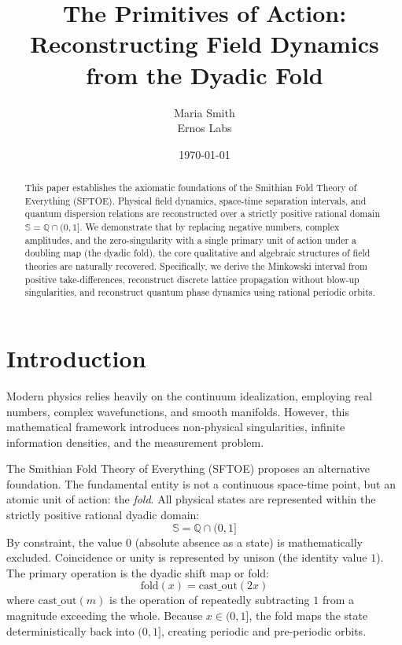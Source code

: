 \documentclass[11pt,a4paper]{article}
\title{\textbf{The Primitives of Action: Reconstructing Field Dynamics from the Dyadic Fold}}
\author{Maria Smith \\ Ernos Labs}
\date{\today}
\begin{document}
\maketitle

\begin{abstract}
This paper establishes the axiomatic foundations of the Smithian Fold Theory of Everything (SFTOE). Physical field dynamics, space-time separation intervals, and quantum dispersion relations are reconstructed over a strictly positive rational domain $\mathbb{S} = \mathbb{Q} \cap (0, 1]$. We demonstrate that by replacing negative numbers, complex amplitudes, and the zero-singularity with a single primary unit of action under a doubling map (the dyadic fold), the core qualitative and algebraic structures of field theories are naturally recovered. Specifically, we derive the Minkowski interval from positive take-differences, reconstruct discrete lattice propagation without blow-up singularities, and reconstruct quantum phase dynamics using rational periodic orbits.
\end{abstract}

\section{Introduction}
Modern physics relies heavily on the continuum idealization, employing real numbers, complex wavefunctions, and smooth manifolds. However, this mathematical framework introduces non-physical singularities, infinite information densities, and the measurement problem. 

The Smithian Fold Theory of Everything (SFTOE) proposes an alternative foundation. The fundamental entity is not a continuous space-time point, but an atomic unit of action: the \textit{fold}. All physical states are represented within the strictly positive rational dyadic domain:
\begin{equation}
\mathbb{S} = \mathbb{Q} \cap (0, 1]
\end{equation}
By constraint, the value $0$ (absolute absence as a state) is mathematically excluded. Coincidence or unity is represented by unison (the identity value $1$). The primary operation is the dyadic shift map or fold:
\begin{equation}
\text{fold}(x) = \text{cast\_out}(2x)
\end{equation}
where $\text{cast\_out}(m)$ is the operation of repeatedly subtracting $1$ from a magnitude exceeding the whole. Because $x \in (0, 1]$, the fold maps the state deterministically back into $(0, 1]$, creating periodic and pre-periodic orbits.
\end{document}
